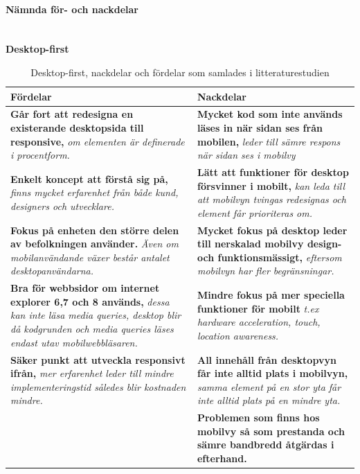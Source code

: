 \documentclass[11pt]{article}
\begin{document}
\paragraph{Nämnda för- och nackdelar}\mbox{} \\

\textbf{Desktop-first}
\begin{table}[H]
\centering
\begin{tabular}{|p{7.2cm}|p{7.2cm}|}
\hline
Fördelar&Nackdelar\\ \hline
\textbf{Går fort att redesigna en existerande desktopsida till responsive, }\textit{om elementen är definerade i procentform.}&\textbf{Mycket kod som inte används läses in när sidan ses från mobilen, }\textit{leder till sämre respons när sidan ses i mobilvy}\\ \hline
\textbf{Enkelt koncept att förstå sig på, }\textit{finns mycket erfarenhet från både kund, designers och utvecklare.}& \textbf{Lätt att funktioner för desktop försvinner i mobilt,} \textit{kan leda till att mobilvyn tvingas redesignas och element får prioriteras om.} \\ \hline
\textbf{Fokus på enheten den större delen av befolkningen använder. }\textit{Även om mobilanvändande växer består antalet desktopanvändarna.}&\textbf{Mycket fokus på desktop leder till nerskalad mobilvy design- och funktionsmässigt, }\textit{eftersom mobilvyn har fler begränsningar.}\\ \hline
\textbf{Bra för webbsidor om internet explorer 6,7 och 8 används, }\textit{dessa kan inte läsa media queries, desktop blir då kodgrunden och media queries läses endast utav mobilwebbläsaren.}&  \textbf{Mindre fokus  på mer speciella funktioner för mobilt} \textit{t.ex hardware acceleration, touch, location awareness.} \\ \hline
\textbf{Säker punkt att utveckla responsivt ifrån, }\textit{mer erfarenhet leder till mindre implementeringstid således blir kostnaden mindre.}&\textbf{All innehåll från desktopvyn får inte alltid plats i mobilvyn,} \textit{samma element på en stor yta får inte alltid plats på en mindre yta.}\\ \hline
~&\textbf{Problemen som finns hos mobilvy så som prestanda och sämre bandbredd åtgärdas i efterhand.}\\ \hline


    \end{tabular}
    \caption {Desktop-first, nackdelar och fördelar som samlades i litteraturestudien}
\end{table}
\newpage
\end{document}

